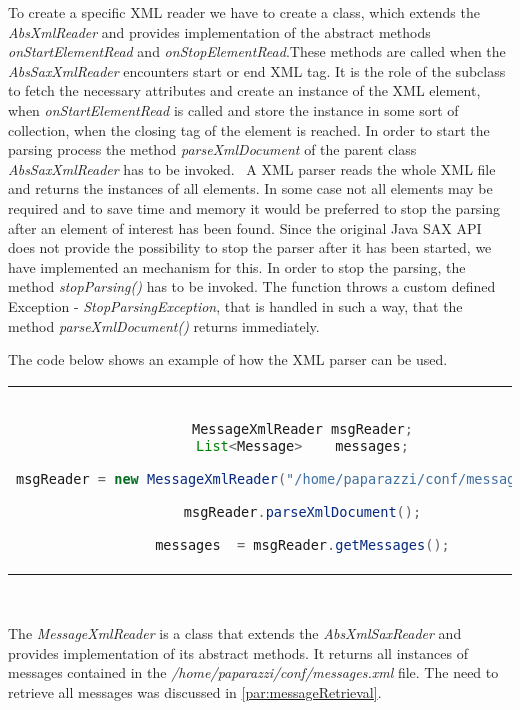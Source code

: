 To create a specific XML reader we have to create a class, which extends the \textit{AbsXmlReader} and provides implementation of the abstract methods \textit{onStartElementRead} and \textit{onStopElementRead}.These methods are called when the \textit{AbsSaxXmlReader} encounters start or end XML tag. It is the role of the subclass to fetch the necessary attributes and create an instance of the XML element, when \textit{onStartElementRead} is called and store the instance in some sort of collection, when the closing tag of the element is reached. In order to start the parsing process the method \textit{parseXmlDocument} of the parent class \textit{AbsSaxXmlReader} has to be invoked. \
A XML parser reads the whole XML file and returns the instances of all elements. In some case not all elements may be required and to save time and memory it would be preferred to stop the parsing after an element of interest has been found. Since the original Java SAX API does not provide the possibility to stop the parser after it has been started, we have implemented an mechanism for this.
In order to stop the parsing, the method \textit{stopParsing()} has to be invoked. The function throws a custom defined Exception - \textit{StopParsingException}, that is handled in such a way, that the method \textit{parseXmlDocument()} returns immediately.

The code below shows an example of how the XML parser can be used.

\begin{center}
\begin{tabular}{c}
\begin{lstlisting}[basicstyle=\small, language=Java]

MessageXmlReader msgReader;
List<Message>    messages;

msgReader = new MessageXmlReader("/home/paparazzi/conf/messages.xml");

msgReader.parseXmlDocument();

messages  = msgReader.getMessages();

\end{lstlisting}
\end{tabular}
\end{center}

\

The \textit{MessageXmlReader} is a class that extends the \textit{AbsXmlSaxReader} and provides implementation of its abstract methods. It returns all instances of messages contained in the \textit{/home/paparazzi/conf/messages.xml} file. The need to retrieve all messages was discussed 
in \ref{par:messageRetrieval}. \

